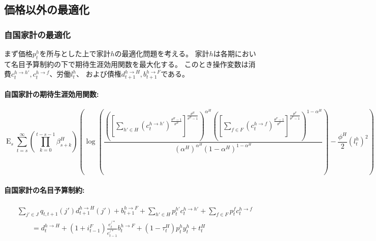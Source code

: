 \subsection{価格以外の最適化}
\label{sec:model_households_optimization}

\subsubsection{自国家計の最適化}
\label{sec:model_households_optimization_home}
まず価格\(p_t^h\)を所与とした上で家計\(h\)の最適化問題を考える。
家計\(h\)は各期において名目予算制約の下で期待生涯効用関数を最大化する。
このとき操作変数は消費\(c_t^{h\to h'},c_t^{h\to f}\)、労働\(l_t^h\)、
および債権\(d_{t+1}^{h\to H},b_{t+1}^{h\to F}\)である。

\paragraph{自国家計の期待生涯効用関数:}
\label{sec:model_households_optimization_home_utility}
\begin{equation}
\label{form:model_households_optimization_home_utility_function}
    \operatorname{E}_s\sum_{t=s}^{\infty}\left(\prod_{k=0}^{t-s-1}\beta_{s+k}^H\right)\left(\log\left(\frac{\left(\left[\sum_{h'\in H}(c_t^{h\to h'})^{\frac{\theta^H-1}{\theta^H}}\right]^{\frac{\theta^H}{\theta^H-1}}\right)^{\alpha^H}\left(\left[\sum_{f\in F}(c_t^{h\to f})^{\frac{\theta^F-1}{\theta^F}}\right]^{\frac{\theta^F}{\theta^F-1}}\right)^{1-\alpha^H}}{(\alpha^H)^{\alpha^H}(1-\alpha^H)^{1-\alpha^H}}\right)-\frac{\phi^H}{2}(l_t^h)^2\right)
\end{equation}

\paragraph{自国家計の名目予算制約:}
\label{sec:model_households_optimization_home_budget}
\begin{equation}
\label{form:model_households_optimization_home_budget_equation}
    \begin{aligned}
        &\sum_{j'\in J}q_{t,t+1}(j')d_{t+1}^{h\to H}(j')+b_{t+1}^{h\to F}+\sum_{h'\in H}p_t^{h'}c_t^{h\to h'}+\sum_{f\in F}p_t^fc_t^{h\to f} \\
        &\qquad=d_t^{h\to H}+(1+i_{t-1}^F)\frac{e_t^{/*}}{e_{t-1}^{/*}}b_t^{h\to F}+(1-\tau_t^H)p_t^hy_t^h+t_t^H
    \end{aligned}
\end{equation}

